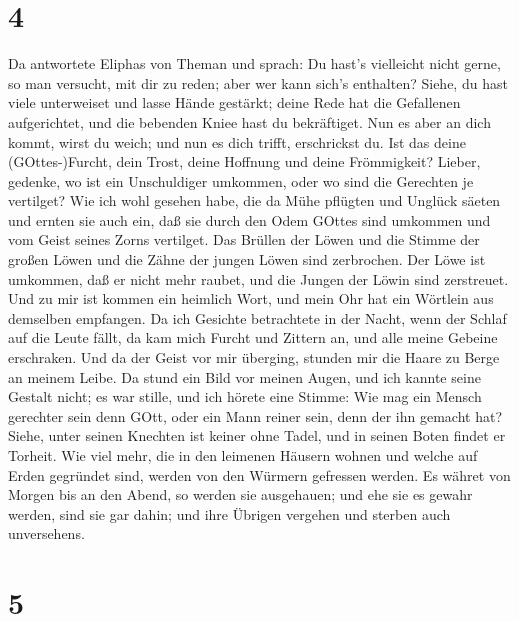 \hypertarget{section-3}{%
\section{4}\label{section-3}}

 Da antwortete Eliphas von Theman und sprach: 
Du hast's vielleicht nicht gerne, so man versucht, mit dir zu reden;
aber wer kann sich's enthalten?  Siehe, du hast viele
unterweiset und lasse Hände gestärkt;  deine Rede hat die
Gefallenen aufgerichtet, und die bebenden Kniee hast du bekräftiget.
 Nun es aber an dich kommt, wirst du weich; und nun es dich
trifft, erschrickst du.  Ist das deine (GOttes-)Furcht, dein
Trost, deine Hoffnung und deine Frömmigkeit?  Lieber,
gedenke, wo ist ein Unschuldiger umkommen, oder wo sind die Gerechten je
vertilget?  Wie ich wohl gesehen habe, die da Mühe pflügten
und Unglück säeten und ernten sie auch ein,  daß sie durch
den Odem GOttes sind umkommen und vom Geist seines Zorns vertilget.
 Das Brüllen der Löwen und die Stimme der großen Löwen und
die Zähne der jungen Löwen sind zerbrochen.  Der Löwe ist
umkommen, daß er nicht mehr raubet, und die Jungen der Löwin sind
zerstreuet.  Und zu mir ist kommen ein heimlich Wort, und
mein Ohr hat ein Wörtlein aus demselben empfangen.  Da ich
Gesichte betrachtete in der Nacht, wenn der Schlaf auf die Leute fällt,
 da kam mich Furcht und Zittern an, und alle meine Gebeine
erschraken.  Und da der Geist vor mir überging, stunden mir
die Haare zu Berge an meinem Leibe.  Da stund ein Bild vor
meinen Augen, und ich kannte seine Gestalt nicht; es war stille, und ich
hörete eine Stimme:  Wie mag ein Mensch gerechter sein denn
GOtt, oder ein Mann reiner sein, denn der ihn gemacht hat? 
Siehe, unter seinen Knechten ist keiner ohne Tadel, und in seinen Boten
findet er Torheit.  Wie viel mehr, die in den leimenen
Häusern wohnen und welche auf Erden gegründet sind, werden von den
Würmern gefressen werden.  Es währet von Morgen bis an den
Abend, so werden sie ausgehauen; und ehe sie es gewahr werden, sind sie
gar dahin;  und ihre Übrigen vergehen und sterben auch
unversehens.

\hypertarget{section-4}{%
\section{5}\label{section-4}}

